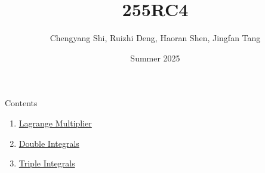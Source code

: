 \documentclass[aspectratio=169, UTF8]{beamer}
\title{\LARGE 255RC4}
\author{Chengyang Shi, Ruizhi Deng, Haoran Shen, Jingfan Tang}
\date{Summer 2025}
\begin{document}
\maketitle



\begin{frame}{Contents}
    \begin{enumerate}
        \item \hyperlink{2}{Lagrange Multiplier}
        \item \hyperlink{2}{Double Integrals}
        \item \hyperlink{3}{Triple Integrals}
    \end{enumerate}
       
\end{frame}

    
\end{document}
